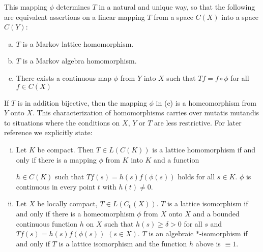This mapping $\phi$ determines $T$ in a natural and unique way, so that the following are equivalent assertions on a linear mapping $T$ from a space $C(X)$ into a space $C(Y)$:
\begin{enumerate}[(a)]
\item 
$T$ is a Markov lattice homomorphism.
\item 
$T$ is a Markov algebra homomorphism.
\item 
There exists a continuous map $\phi$ from $Y$ into $X$ such that $Tf = f \circ \phi$ for all $f \in C(X)$
\end{enumerate}
If $T$ is in addition bijective, then the mapping $\phi$ in (c) is a homeomorphism from $Y$ onto $X$.
This characterization of homomorphisms carries over mutatis mutandis to situations where the conditions on $X$, $Y$ or $T$ are less restrictive.
For later reference we explicitly state:
\begin{enumerate}[(i)]
\item Let $K$ be compact. Then $T \in L(C(K))$ is a lattice homomorphism if and only if there is a mapping $\phi$ from $K$ into $K$ and a function


$h \in C(K)$ such that $Tf(s) = h(s)f(\phi(s))$ holds for all $s \in K$.
$\phi$ is continuous in every point $t$ with $h(t) \neq 0$.


\item Let $X$ be locally compact, $T \in L(C_{0}(X))$.
$T$ is a lattice isomorphism if and only if there is a homeomorphism $\phi$ from $X$ onto $X$ and a bounded continuous function $h$ on $X$ such that $h(s) \geq \delta > 0$ for all $s$ and $Tf(s) = h(s)f(\phi(s))$ $(s \in X)$.
$T$ is an algebraic $*$-isomorphism if and only if $T$ is a lattice isomorphism and the function $h$ above is $\equiv 1$.
\end{enumerate}






